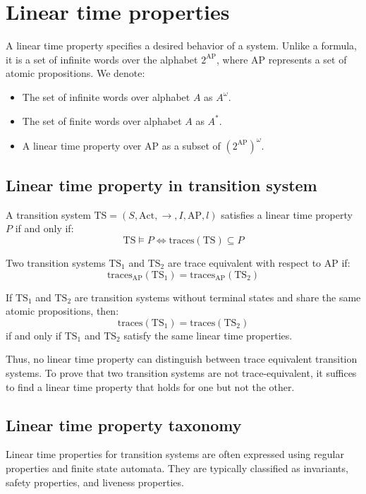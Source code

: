 \section{Linear time properties}

A linear time property specifies a desired behavior of a system. 
Unlike a formula, it is a set of infinite words over the alphabet $2^{\text{AP}}$, where $\text{AP}$ represents a set of atomic propositions.
We denote: 
\begin{itemize}
    \item The set of infinite words over alphabet $A$ as $A^\omega$. 
    \item The set of finite words over alphabet $A$ as $A^\ast$. 
    \item A linear time property over $\text{AP}$ as a subset of $\left(2^{\text{AP}}\right)^\omega$. 
\end{itemize}

\subsection{Linear time property in transition system}
\begin{definition}
    A transition system $\text{TS}=(S,\text{Act},\rightarrow,I,\text{AP},l)$ satisfies a linear time property $P$ if and only if: 
    \[\text{TS}\models P\Leftrightarrow\text{traces}(\text{TS})\subseteq P\] 
\end{definition}
\begin{definition}
    Two transition systems $\text{TS}_1$ and $\text{TS}_2$ are trace equivalent with respect to $\text{AP}$ if: 
    \[\text{traces}_{\text{AP}}(\text{TS}_1)=\text{traces}_{\text{AP}}(\text{TS}_2)\]
\end{definition}
\begin{corollary}
    If $\text{TS}_1$ and $\text{TS}_2$ are transition systems without terminal states and share the same atomic propositions, then:
    \[\text{traces}(\text{TS}_1)=\text{traces}(\text{TS}_2)\] 
    if and only if $\text{TS}_1$ and $\text{TS}_2$ satisfy the same linear time properties. 
\end{corollary}
\noindent Thus, no linear time property can distinguish between trace equivalent transition systems. 
To prove that two transition systems are not trace-equivalent, it suffices to find a linear time property that holds for one but not the other.

\subsection{Linear time property taxonomy}
Linear time properties for transition systems are often expressed using regular properties and finite state automata. 
They are typically classified as invariants, safety properties, and liveness properties.

